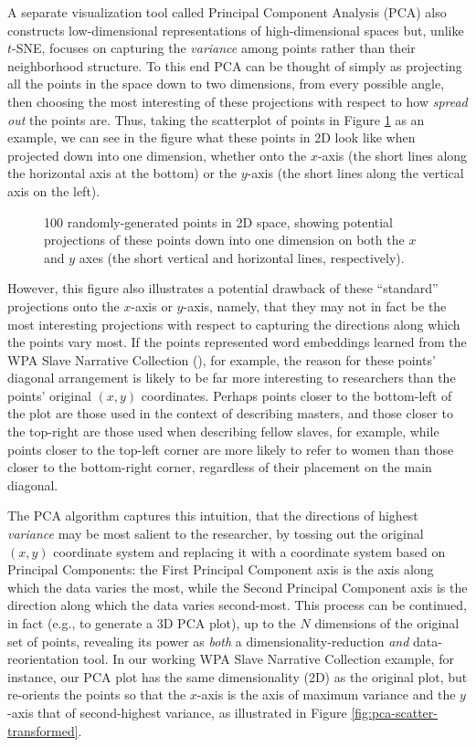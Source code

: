 \documentclass[11pt]{article}
\begin{document}
A separate visualization tool called Principal Component Analysis (PCA) also constructs low-dimensional representations of high-dimensional spaces but, unlike $t$-SNE, focuses on capturing the \textit{variance} among points rather than their neighborhood structure. To this end PCA can be thought of simply as projecting all the points in the space down to two dimensions, from every possible angle, then choosing the most interesting of these projections with respect to how \textit{spread out} the points are. Thus, taking the scatterplot of points in Figure \ref{fig:pca-scatter} as an example, we can see in the figure what these points in 2D look like when projected down into one dimension, whether onto the $x$-axis (the short lines along the horizontal axis at the bottom) or the $y$-axis (the short lines along the vertical axis on the left).

\begin{figure}[ht!]
\centering

\caption{100 randomly-generated points in 2D space, showing potential projections of these points down into one dimension on both the $x$ and $y$ axes (the short vertical and horizontal lines, respectively).}
\label{fig:pca-scatter}
\end{figure}

However, this figure also illustrates a potential drawback of these ``standard'' projections onto the $x$-axis or $y$-axis, namely, that they may not in fact be the most interesting projections with respect to capturing the directions along which the points vary most. If the points represented word embeddings learned from the WPA Slave Narrative Collection (\cite{yetman_background_1967}), for example, the reason for these points' diagonal arrangement is likely to be far more interesting to researchers than the points' original $(x,y)$ coordinates. Perhaps points closer to the bottom-left of the plot are those used in the context of describing masters, and those closer to the top-right are those used when describing fellow slaves, for example, while points closer to the top-left corner are more likely to refer to women than those closer to the bottom-right corner, regardless of their placement on the main diagonal.

The PCA algorithm captures this intuition, that the directions of highest \textit{variance} may be most salient to the researcher, by tossing out the original $(x,y)$ coordinate system and replacing it with a coordinate system based on Principal Components: the First Principal Component axis is the axis along which the data varies the most, while the Second Principal Component axis is the direction along which the data varies second-most. This process can be continued, in fact (e.g., to generate a 3D PCA plot), up to the $N$ dimensions of the original set of points, revealing its power as \textit{both} a dimensionality-reduction \textit{and} data-reorientation tool. In our working WPA Slave Narrative Collection example, for instance, our PCA plot has the same dimensionality (2D) as the original plot, but re-orients the points so that the $x$-axis is the axis of maximum variance and the $y$-axis that of second-highest variance, as illustrated in Figure \ref{fig:pca-scatter-transformed}.
\end{document}
